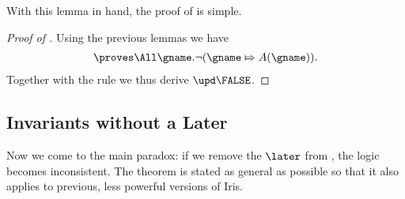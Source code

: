 With this lemma in hand, the proof of  is simple.
\begin{proof}[Proof of ]
  Using the previous lemmas we have
  \begin{align*}
    \proves \All \gname. \lnot (\gname \Mapsto A(\gname)).
  \end{align*}
  Together with the rule  we thus derive $\upd \FALSE$.
\end{proof}

\subsection{Invariants without a Later}
\label{app:section:invariants-without-a-later}

Now we come to the main paradox: if we remove the $\later$ from , the logic becomes inconsistent.
The theorem is stated as general as possible so that it also applies to previous, less powerful versions of Iris.

